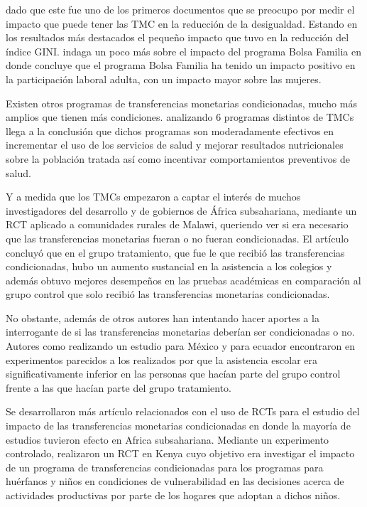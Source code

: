 \documentclass[AER]{AEA}
\begin{document}
\cite{Soares2007ConditionalPaper} dado que este fue uno de los primeros documentos que se preocupo por medir el impacto que puede tener las TMC en la reducción de la desigualdad. Estando en los resultados más destacados el pequeño impacto que tuvo en la reducción del índice GINI.\cite{Soares2010EvaluatingPerspective} indaga un poco más sobre el impacto del programa Bolsa Familia en donde concluye que el programa Bolsa Familia ha tenido un impacto positivo en la participación laboral adulta, con un impacto mayor sobre las mujeres.

Existen otros programas de transferencias monetarias condicionadas, mucho más amplios que tienen más condiciones. \cite{Lagarde2007ConditionalReview} analizando 6 programas distintos de TMCs llega a la conclusión que dichos programas son moderadamente efectivos en incrementar el uso de los servicios de salud y mejorar resultados nutricionales sobre la población tratada así como incentivar comportamientos preventivos de salud. 

Y a medida que los TMCs empezaron a captar el interés de muchos investigadores del desarrollo y de gobiernos de África subsahariana, \cite{Baird2011} mediante un RCT aplicado a comunidades rurales de Malawi, queriendo ver si era necesario que las transferencias monetarias fueran o no fueran condicionadas. El artículo concluyó que en el grupo tratamiento, que fue le que recibió las transferencias condicionadas, hubo un aumento sustancial en la asistencia a los colegios y además obtuvo mejores desempeños en las pruebas académicas en comparación al grupo control que solo recibió las transferencias monetarias condicionadas. 

No obstante, además de \cite{Baird2011} otros autores han intentando hacer aportes a la interrogante  de si las transferencias monetarias deberían ser condicionadas o no. Autores como \cite{DeBrauw2011MustMexico} realizando un estudio para México y \cite{NorbertSchady2008CashEcuador} para ecuador encontraron en experimentos parecidos a los realizados por \cite{Baird2011} que la asistencia escolar era significativamente inferior en las personas que hacían parte del grupo control frente a las que hacían parte del grupo tratamiento.

Se desarrollaron más artículo relacionados con el uso de RCTs para el estudio del impacto de las transferencias monetarias condicionadas en donde la mayoría de estudios tuvieron efecto en Africa subsahariana. Mediante un experimento controlado, \cite{Asfaw2014CashKenya} realizaron un RCT en Kenya cuyo objetivo era investigar el impacto de un programa de transferencias condicionadas para los programas para huérfanos y niños en condiciones de vulnerabilidad en las decisiones acerca de actividades productivas por parte de los hogares que adoptan a dichos niños.
\end{document}
